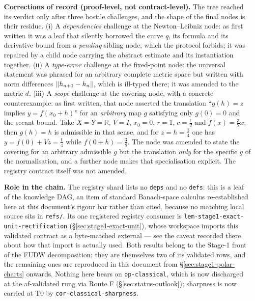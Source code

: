 \noindent\textbf{Corrections of record (proof-level, not contract-level).} The tree reached
its verdict only after three hostile challenges, and the shape of the final nodes is their
residue. (i) A \emph{dependencies} challenge at the Newton--Leibniz node: as first written
it was a leaf that silently borrowed the curve $q$, its formula and its derivative bound
from a \emph{pending} sibling node, which the protocol forbids; it was repaired by a child
node carrying the abstract estimate and its instantiation together. (ii) A \emph{type-error}
challenge at the fixed-point node: the universal statement was phrased for an arbitrary
complete metric space but written with norm differences $\lVert h_{n+1}-h_n\rVert$, which is
ill-typed there; it was amended to the metric $d$. (iii) A \emph{scope} challenge at the
covering node, with a concrete counterexample: as first written, that node asserted the
translation ``$g(h)=z$ implies $y=f(x_0+h)$'' for an \emph{arbitrary} map $g$ satisfying
only $g(0)=0$ and the secant bound. Take $X=Y=\mathbb R$, $V=I$, $x_0=0$, $r=1$,
$c=\tfrac12$ and $f(x)=\tfrac32x$; then $g(h)=h$ is admissible in that sense, and for
$z=h=\tfrac14$ one has $y=f(0)+Vz=\tfrac14$ while $f(0+h)=\tfrac38$. The node was amended to
state the covering for an arbitrary admissible $g$ but the translation \emph{only} for the
specific $g$ of the normalisation, and a further node makes that specialisation explicit.
The registry contract itself was not amended.

\noindent\textbf{Role in the chain.} The registry shard lists no \texttt{deps} and no
\texttt{defs}: this is a leaf of the knowledge DAG, an item of standard Banach-space
calculus re-established here at this document's rigour bar rather than cited, because no
matching local source sits in \texttt{refs/}. Its one registered registry consumer is
\texttt{lem-stage1-exact-unit-rectification} (\S\ref{sec:stage1-exact-unit}), whose
workspace imports this validated contract as a byte-matched external --- see the caveat
recorded there about how that import is actually used. Both results belong to the Stage-1
front of the FUDW decomposition: they are themselves two of its validated rows, and the
remaining ones are reproduced in this document from \S\ref{sec:stage1-polar-charts}
onwards.
Nothing here bears on \texttt{op-classical}, which is now discharged at the af-validated rung via Route F (\S\ref{sec:status-outlook}); sharpness is now carried at T0 by \texttt{cor-classical-sharpness}.

